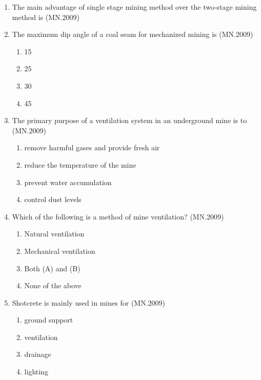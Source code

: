 \documentclass[journal]{IEEEtran}
\numberwithin{equation}{enumi}
\numberwithin{figure}{enumi}
\begin{document}
\begin{enumerate}
\item The main advantage of single stage mining method over the two-stage mining method is
\hfill{(MN.2009)}
\begin{enumerate}[label=(\Alph*)]
\end{enumerate}

\item The maximum dip angle of a coal seam for mechanized mining is
\hfill{(MN.2009)}
\begin{enumerate}[label=(\Alph*)]
    \item 15\degree
    \item 25\degree
    \item 30\degree
    \item 45\degree
\end{enumerate}

\item The primary purpose of a ventilation system in an underground mine is to
\hfill{(MN.2009)}
\begin{enumerate}[label=(\Alph*)]
    \item remove harmful gases and provide fresh air
    \item reduce the temperature of the mine
    \item prevent water accumulation
    \item control dust levels
\end{enumerate}

\item Which of the following is a method of mine ventilation?
\hfill{(MN.2009)}
\begin{enumerate}[label=(\Alph*)]
    \item Natural ventilation
    \item Mechanical ventilation
    \item Both (A) and (B)
    \item None of the above
\end{enumerate}

\item Shotcrete is mainly used in mines for
\hfill{(MN.2009)}
\begin{enumerate}[label=(\Alph*)]
    \item ground support
    \item ventilation
    \item drainage
    \item lighting
\end{enumerate}


\end{enumerate}
\end{document}
